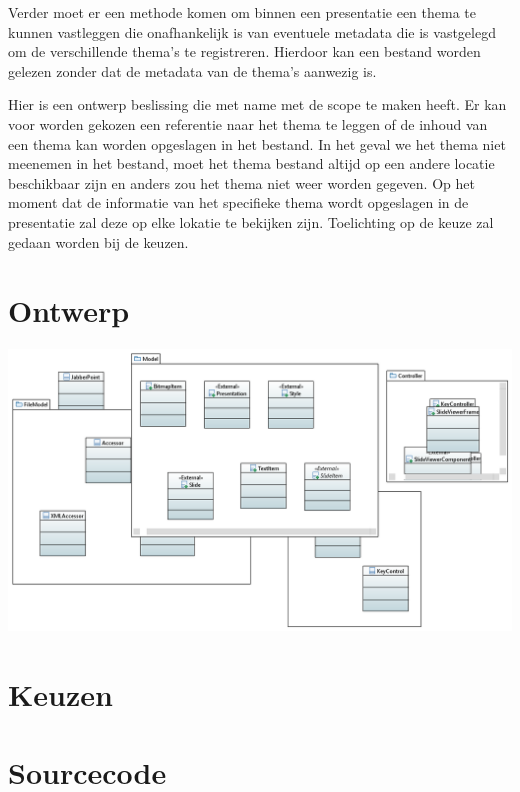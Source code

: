 \documentclass[a4paper]{article}
\begin{document}
Verder moet er een methode komen om binnen een presentatie een thema te kunnen vastleggen die onafhankelijk is van eventuele metadata die is vastgelegd om de verschillende thema's te registreren. Hierdoor kan een bestand worden gelezen zonder dat de metadata van de thema's aanwezig is.

Hier is een ontwerp beslissing die met name met de scope te maken heeft. Er kan voor worden gekozen een referentie naar het thema te leggen of de inhoud van een thema kan worden opgeslagen in het bestand. In het geval we het thema niet meenemen in het bestand, moet het thema bestand altijd op een andere locatie beschikbaar zijn en anders zou het thema niet weer worden gegeven. Op het moment dat de informatie van het specifieke thema wordt opgeslagen in de presentatie zal deze op elke lokatie te bekijken zijn. Toelichting op de keuze zal gedaan worden bij de keuzen.

\section{Ontwerp}

\includegraphics[width=14cm]{design.png} 

\section{Keuzen}



\section{Sourcecode}
\end{document}
